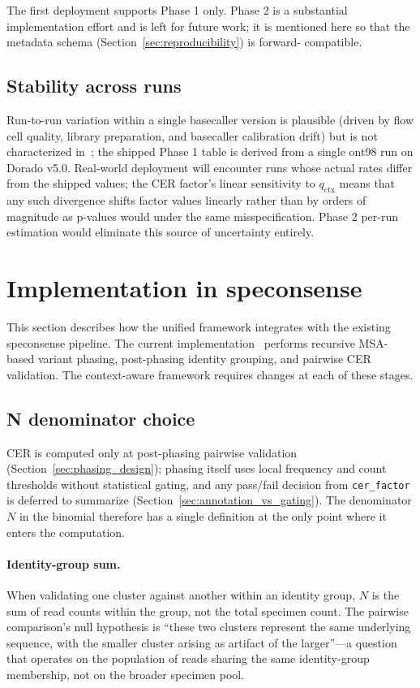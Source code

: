 \documentclass[11pt]{article}
\begin{document}
The first deployment supports Phase 1 only. Phase 2 is a substantial
implementation effort and is left for future work; it is mentioned here so
that the metadata schema (Section~\ref{sec:reproducibility}) is forward-
compatible.

\subsection{Stability across runs}

Run-to-run variation within a single basecaller version is plausible
(driven by flow cell quality, library preparation, and basecaller calibration
drift) but is not characterized in~\cite{hp_paper}; the shipped Phase 1
table is derived from a single ont98 run on Dorado v5.0. Real-world deployment
will encounter runs whose actual rates differ from the shipped values; the
CER factor's linear sensitivity to $q_\text{ctx}$ means that any such
divergence shifts factor values linearly rather than by orders of magnitude
as p-values would under the same misspecification. Phase 2 per-run estimation
would eliminate this source of uncertainty entirely.

\section{Implementation in speconsense}
\label{sec:implementation}

This section describes how the unified framework integrates with the existing
speconsense pipeline. The current implementation~\cite{speconsense} performs
recursive MSA-based variant phasing, post-phasing identity grouping, and
pairwise CER validation. The context-aware framework requires changes at each
of these stages.

\subsection{N denominator choice}
\label{sec:n_choice}

CER is computed only at post-phasing pairwise validation
(Section~\ref{sec:phasing_design}); phasing itself uses local frequency and
count thresholds without statistical gating, and any pass/fail decision from
\texttt{cer\_factor} is deferred to summarize
(Section~\ref{sec:annotation_vs_gating}). The denominator $N$ in the binomial
therefore has a single definition at the only point where it enters the
computation.

\paragraph{Identity-group sum.} When validating one cluster against another
within an identity group, $N$ is the sum of read counts within the group, not
the total specimen count. The pairwise comparison's null hypothesis is
``these two clusters represent the same underlying sequence, with the smaller
cluster arising as artifact of the larger''---a question that operates on the
population of reads sharing the same identity-group membership, not on the
broader specimen pool.
\end{document}

